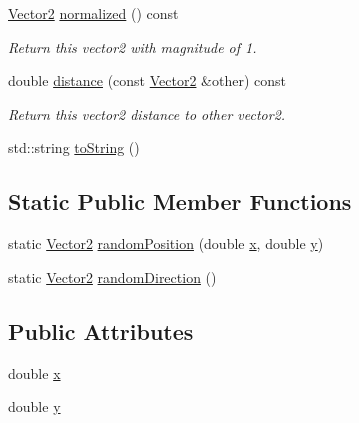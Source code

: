 \begin{DoxyCompactItemize}
\mbox{\hyperlink{struct_vector2}{Vector2}} \mbox{\hyperlink{struct_vector2_a1e0be0f2d578e8b5d0b8f95a9f8b6626}{normalized}} () const
\begin{DoxyCompactList}\small\item\em Return this vector2 with magnitude of 1. \end{DoxyCompactList}\item 
double \mbox{\hyperlink{struct_vector2_a75a29091c7c6f2f38e987ed2c62283c8}{distance}} (const \mbox{\hyperlink{struct_vector2}{Vector2}} \&other) const
\begin{DoxyCompactList}\small\item\em Return this vector2 distance to other vector2. \end{DoxyCompactList}\item 
std\+::string \mbox{\hyperlink{struct_vector2_abcf7d729573613553822f965c3b9a3d2}{to\+String}} ()
\end{DoxyCompactItemize}
\subsection*{Static Public Member Functions}
\begin{DoxyCompactItemize}
\item 
static \mbox{\hyperlink{struct_vector2}{Vector2}} \mbox{\hyperlink{struct_vector2_a13b12c4d8b92bbc3de6fca42cb7a2749}{random\+Position}} (double \mbox{\hyperlink{struct_vector2_a61d73d9036ccbb3257fbe595c014a1d0}{x}}, double \mbox{\hyperlink{struct_vector2_a4df9b2a8e79e6e30a7a3b34722d8b8b8}{y}})
\item 
static \mbox{\hyperlink{struct_vector2}{Vector2}} \mbox{\hyperlink{struct_vector2_a4ae4f36c515bda9939cfe36e58b25f45}{random\+Direction}} ()
\end{DoxyCompactItemize}
\subsection*{Public Attributes}
\begin{DoxyCompactItemize}
\item 
double \mbox{\hyperlink{struct_vector2_a61d73d9036ccbb3257fbe595c014a1d0}{x}}
\item 
double \mbox{\hyperlink{struct_vector2_a4df9b2a8e79e6e30a7a3b34722d8b8b8}{y}}
\end{DoxyCompactItemize}
